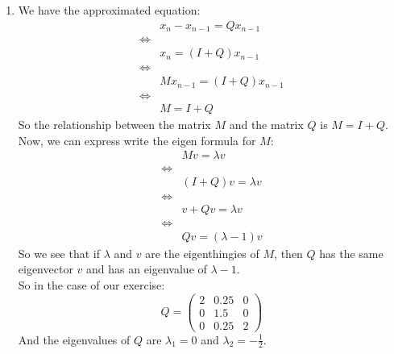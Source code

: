 \documentclass[11pt, legalpaper]{article}
\begin{document}
\begin{enumerate}
    \item We have the approximated equation:
    \begin{align*}
        &x_n-x_{n-1}=Qx_{n-1}\\
        \Longleftrightarrow & \\
        &x_n=(I+Q)x_{n-1}\\
        \Longleftrightarrow & \\
        &Mx_{n-1}=(I+Q)x_{n-1}\\
        \Longleftrightarrow & \\
        &M=I+Q
    \end{align*}
    So the relationship between the matrix $M$ and the matrix $Q$ is $ \boxed{M=I+Q}$.\\
    Now, we can express write the eigen formula for $M$:
    \begin{align*}
        &Mv=\lambda v\\
        \Longleftrightarrow & \\
        &(I+Q)v=\lambda v\\
        \Longleftrightarrow & \\
        &v+Qv=\lambda v\\
        \Longleftrightarrow& \\
        &Qv=(\lambda-1) v
    \end{align*}
    So we see that if $\lambda$ and $v$ are the eigenthingies of $M$, then $Q$ has the same eigenvector $v$ and has an eigenvalue of $\lambda-1$. \\
    So in the case of our exercise:
    $$Q=\begin{pmatrix}
        2 & 0.25 & 0 \\
        0 & 1.5 & 0 \\
        0 & 0.25 & 2
    \end{pmatrix}$$
    And the eigenvalues of $Q$ are $\lambda_1=0$ and $\lambda_2=-\frac{1}{2}$. 
    
    
\end{enumerate}
\end{document}
